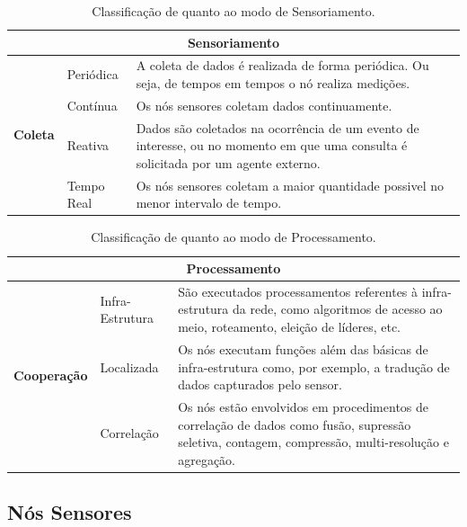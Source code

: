 \begin{table}[h!]
\centering
\small
	\begin{tabular}{ | l | l | p{8.5cm} | }
		\hline
		\multicolumn{3}{|c|}{\textbf{Sensoriamento}} \\
		\hline

		\multirow{4}{*}{\textbf{Coleta}}
				 & Periódica & A coleta de dados é realizada de forma periódica. Ou seja, de tempos em tempos o nó realiza medições. \\ 
				\cline{2-3}
			       	& Contínua &  Os nós sensores coletam dados continuamente.  \\
				\cline{2-3}
				 & Reativa & Dados são coletados na ocorrência de um evento de interesse, ou no momento em que uma consulta é solicitada por um agente externo. \\ 
				\cline{2-3}
			       	& Tempo Real & Os nós sensores coletam a maior quantidade possivel no menor intervalo de tempo.  \\
		\hline
	\end{tabular}

	\caption{Classificação de \rssfs quanto ao modo de Sensoriamento.}
	\label{tbl:sensoriamento}
\end{table}


\begin{table}[h!]
\centering
\small
	\begin{tabular}{ | l | l | p{7.2cm} | }
		\hline
		\multicolumn{3}{|c|}{\textbf{Processamento}} \\
		\hline

		\multirow{3}{*}{\textbf{Cooperação}}
				 & Infra-Estrutura & São executados processamentos referentes à infra-estrutura da rede, como algoritmos de acesso ao meio, roteamento, eleição de líderes, etc. \\ 
				\cline{2-3}
			       	& Localizada &  Os nós executam funções além das básicas de infra-estrutura como, por exemplo, a tradução de dados capturados pelo sensor.  \\
				\cline{2-3}
				& Correlação & Os nós estão envolvidos em procedimentos de correlação de dados como fusão, supressão seletiva, contagem, compressão, multi-resolução e agregação. \\
		\hline
	\end{tabular}

	\caption{Classificação de \rssfs quanto ao modo de Processamento.}
	\label{tbl:processamento}
\end{table}

\subsection{Nós Sensores}

